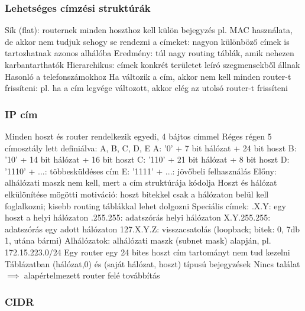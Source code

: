 \documentclass[12pt,a4paper]{article}
\begin{document}
\pagebreak

\subsubsection{Lehetséges címzési struktúrák}

\begin{outline}
	\1 Sík (flat): routernek minden hoszthoz kell külön bejegyzés
		\2 pl. MAC használata, de akkor nem tudjuk sehogy se rendezni a címeket: nagyon különböző címek is tartozhatnak azonos alhálóba
		\2 Eredmény: túl nagy routing táblák, amik nehezen karbantarthatók
	\1 Hierarchikus: címek konkrét területet leíró szegmensekből állnak
		\2 Hasonló a telefonszámokhoz
		\2 Ha változik a cím, akkor nem kell minden router-t frissíteni: pl. ha a cím legvége változott, akkor elég az utolsó router-t frissíteni
\end{outline}

\subsubsection{IP cím}

\begin{outline}
	\1 Minden hoszt és router rendelkezik egyedi, 4 bájtos címmel
	\1 Réges régen 5 címosztály lett definiálva: A, B, C, D, E
		\2 A: '0' + 7 bit hálózat + 24 bit hoszt
		\2 B: '10' + 14 bit hálózat + 16 bit hoszt
		\2 C: '110' + 21 bit hálózat + 8 bit hoszt
		\2 D: '1110' + ...: többesküldéses cím
		\2 E: '1111' + ...: jövőbeli felhasználás
		\2 Előny: alhálózati maszk nem kell, mert a cím struktúrája kódolja
	\1 Hoszt és hálózat elkülönítése mögötti motiváció: hoszt bitekkel csak a hálózaton belül kell foglalkozni; kisebb routing táblákkal lehet dolgozni
	\1 Speciális címek:
		.X.Y: egy hoszt a helyi hálózaton
		.255.255: adatszórás helyi hálózaton
		\2 X.Y.255.255: adatszórás egy adott hálózaton
		\2 127.X.Y.Z: visszacsatolás (loopback; bitek: 0, 7db 1, utána bármi)
	\1 Alhálózatok: alhálózati maszk (subnet mask) alapján, pl. 172.15.223.0/24
		\2 Egy router egy 24 bites hoszt cím tartományt nem tud kezelni
		\2 Táblázatban (hálózat,0) és (saját hálózat, hoszt) típusú bejegyzések
		\2 Nincs találat $\implies$ alapértelmezett router felé továbbítás
\end{outline}

\pagebreak

\subsubsection{CIDR}
\end{document}
